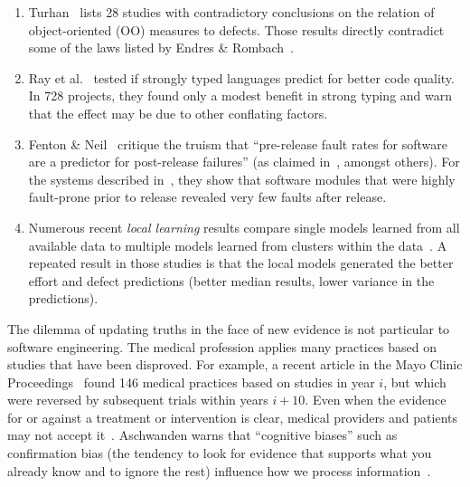 \documentclass[smallcondensed]{svjour3}
\newcommand{\be}{\begin{enumerate}}
\newcommand{\ee}{\end{enumerate}}
\begin{document}
\be
\item
Turhan~\cite{me12d} lists 28 studies with contradictory conclusions
on the relation of object-oriented (OO) measures to defects.  Those results
 directly  contradict some of the laws listed by 
Endres \& Rombach~\cite{endres03}.
\item
Ray et al.~\cite{ray2014lang} tested if   strongly typed languages
predict for better code quality. In  728 projects,
they found  only a modest benefit in strong typing and warn that the effect may be due to other conflating factors.
\item
Fenton \& Neil~\cite{fenton00,fenton00b}   critique the truism that
``pre-release fault rates for software
are a predictor for post-release failures'' (as claimed in~\cite{dunsmore88},
amongst others). For the systems described in~\cite{fenton97}, they
show that software modules that were highly fault-prone
prior to release revealed very few faults after release.
\item
Numerous recent {\em local learning} results compare single models
learned from all available data to multiple models learned from clusters within the data~\cite{betten14,yang11,yang13,minku13,me12d,me11m,betta12,posnett11}.
A repeated result in those studies is that the local models generated the better effort
and defect predictions (better median results,
lower variance in the predictions).
\ee
 
The dilemma of updating truths in the face of new evidence is not particular to software engineering. 
The medical profession applies  many practices based on studies
that have been disproved. For example,
a  recent article
in the Mayo Clinic Proceedings~\cite{prasad13} found  
146 medical practices based on studies 
in year $i$, but which were  reversed by subsequent trials within years $i+10$.
Even when the evidence for or against a treatment or intervention is clear, medical providers and patients may not accept it~\cite{aschwanden10}.
Aschwanden warns that ``cognitive biases''  such as  confirmation bias (the tendency to look for evidence that supports what you already know and to ignore the rest)  influence how we process information~\cite{aschwanden15}.
\end{document}
